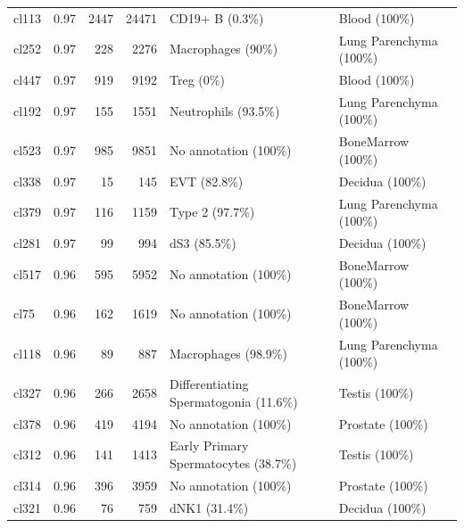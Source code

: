 \begin{table}[ht!]
\begin{tabular}{lrrrll}
  cl113 & 0.97 & 2447 & 24471 & CD19+ B (0.3\%) & Blood (100\%) \\ 
  cl252 & 0.97 & 228 & 2276 & Macrophages (90\%) & Lung Parenchyma (100\%) \\ 
  cl447 & 0.97 & 919 & 9192 & Treg (0\%) & Blood (100\%) \\ 
  cl192 & 0.97 & 155 & 1551 & Neutrophils (93.5\%) & Lung Parenchyma (100\%) \\ 
  cl523 & 0.97 & 985 & 9851 & No annotation (100\%) & BoneMarrow (100\%) \\ 
  cl338 & 0.97 &  15 & 145 & EVT (82.8\%) & Decidua (100\%) \\ 
  cl379 & 0.97 & 116 & 1159 & Type 2 (97.7\%) & Lung Parenchyma (100\%) \\ 
  cl281 & 0.97 &  99 & 994 & dS3 (85.5\%) & Decidua (100\%) \\ 
  cl517 & 0.96 & 595 & 5952 & No annotation (100\%) & BoneMarrow (100\%) \\ 
  cl75 & 0.96 & 162 & 1619 & No annotation (100\%) & BoneMarrow (100\%) \\ 
  cl118 & 0.96 &  89 & 887 & Macrophages (98.9\%) & Lung Parenchyma (100\%) \\ 
  cl327 & 0.96 & 266 & 2658 & Differentiating Spermatogonia (11.6\%) & Testis (100\%) \\ 
  cl378 & 0.96 & 419 & 4194 & No annotation (100\%) & Prostate (100\%) \\ 
  cl312 & 0.96 & 141 & 1413 & Early Primary Spermatocytes (38.7\%) & Testis (100\%) \\ 
  cl314 & 0.96 & 396 & 3959 & No annotation (100\%) & Prostate (100\%) \\
  cl321 & 0.96 &  76 & 759 & dNK1 (31.4\%) & Decidua (100\%) \\ 
   \bottomrule
\end{tabular}
\end{table}  
  
